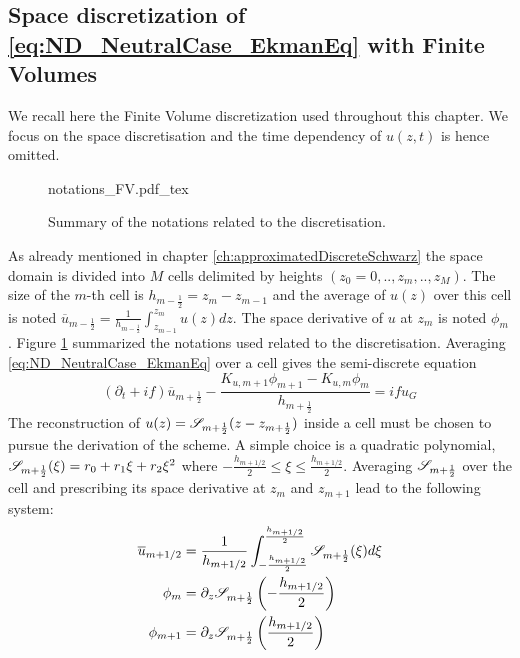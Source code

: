 \subsection{Space discretization of
\eqref{eq:ND_NeutralCase_EkmanEq} with Finite Volumes}
\label{sec:ND_NeutralCase_recallSplines}
We recall here the Finite Volume discretization used throughout
this chapter. We focus on the space discretisation and the time
dependency of $u(z, t)$ is hence omitted.
\begin{figure}
	\centering
	{notations_FV.pdf_tex}
	\caption{Summary of the notations related to the discretisation.}
	\label{fig:ND_NeutralCase_summary_notations}
\end{figure}
\par
As already mentioned in chapter \ref{ch:approximatedDiscreteSchwarz}
the space domain is divided into $M$ cells delimited by
heights $(z_0=0, .., z_m, .., z_M)$. The size of the $m$-th cell
is $h_{m-\frac{1}{2}}=z_{m}-z_{m-1}$ and the average of $u(z)$
over this cell is noted
$\overline{u}_{m-\frac{1}{2}}=\frac{1} {h_{m-\frac{1}{2}}}
\int_{z_{m-1}}^{z_m}u(z)dz$.
The space derivative of $u$ at $z_m$ is noted $\phi_{m}$.
Figure \ref{fig:ND_NeutralCase_summary_notations} summarized
the notations used related to the discretisation.
Averaging \eqref{eq:ND_NeutralCase_EkmanEq} over a cell gives
the semi-discrete equation
\begin{equation}
\label{eq:ND_NeutralCase_semiDiscreteEkmanEq}
	(\partial_t + if) \overline{u}_{m+\frac{1}{2}} - 
	\frac{K_{u, m+1} \phi_{m+1} - K_{u, m} \phi_{m}}
		{h_{m+\frac{1}{2}}} = i f u_G
\end{equation}
The reconstruction of $u(z) = {\cal S}_{m+\frac{1}{2}}
				(z - z_{m+\frac{1}{2}})$
				inside a cell must be chosen
to pursue the derivation of the scheme. A simple choice is
a quadratic polynomial,
${\cal S}_{m+\frac{1}{2}}(\xi) = r_0 + r_1 \xi + r_2 \xi^2$ where
$-\frac{h_{m+1/2}}{2} \leq \xi \leq \frac{h_{m+1/2}}{2}$.
Averaging ${\cal S}_{m+\frac{1}{2}}$ over the cell and
prescribing its space derivative at $z_{m}$ and $z_{m+1}$
lead to the following system:
\begin{equation}
	\begin{aligned}
		\overline{u}_{m+1/2} &= \frac{1}{h_{m+1/2}}
		\int_{-\frac{h_{m+1/2}}{2}}^{\frac{h_{m+1/2}}{2}}
		{\cal S}_{m+\frac{1}{2}}(\xi)d\xi\\
		\phi_m &= \partial_z {\cal S}_{m+\frac{1}{2}}
		\left(-\frac{h_{m+1/2}}{2}\right)\\
		\phi_{m+1} &=
		\partial_z {\cal S}_{m+\frac{1}{2}}
		\left(\frac{h_{m+1/2}}{2}\right)
	\end{aligned}
\end{equation}
